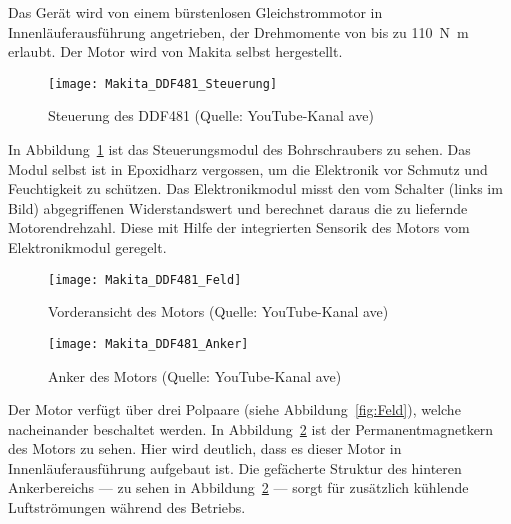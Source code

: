Das Gerät wird von einem bürstenlosen Gleichstrommotor in Innenläuferausführung angetrieben, der Drehmomente von bis zu \SI{110}{\newton\meter} erlaubt. Der Motor wird von Makita selbst hergestellt.

\begin{figure}[h]
  \centering
  \texttt{[image: Makita\_DDF481\_Steuerung]}
  \caption{Steuerung des DDF481 (Quelle: YouTube-Kanal \glqq{}ave\grqq{})}
  \label{fig:Steuerung}
\end{figure}

In Abbildung~\ref{fig:Steuerung} ist das Steuerungsmodul des Bohrschraubers zu sehen. Das Modul selbst ist in Epoxidharz vergossen, um die Elektronik vor Schmutz und Feuchtigkeit zu schützen. Das Elektronikmodul misst den vom Schalter (links im Bild) abgegriffenen Widerstandswert und berechnet daraus die zu liefernde Motorendrehzahl. Diese mit Hilfe der integrierten Sensorik des Motors vom Elektronikmodul geregelt.

\begin{figure}[h]
  \begin{minipage}{.48\textwidth}
    \centering
    \texttt{[image: Makita\_DDF481\_Feld]}
    \caption{Vorderansicht des Motors (Quelle: YouTube-Kanal \glqq{}ave\grqq{})}
    \label{fig:Feld}
  \end{minipage}\hfill%
  \begin{minipage}{.48\textwidth}
    \centering
    \texttt{[image: Makita\_DDF481\_Anker]}
    \caption{Anker des Motors (Quelle: YouTube-Kanal \glqq{}ave\grqq{})}
    \label{fig:Anker}
  \end{minipage}
\end{figure}

Der Motor verfügt über drei Polpaare (siehe Abbildung~\ref{fig:Feld}), welche nacheinander beschaltet werden. In Abbildung~\ref{fig:Anker} ist der Permanentmagnetkern des Motors zu sehen. Hier wird deutlich, dass es dieser Motor in Innenläuferausführung aufgebaut ist. Die gefächerte Struktur des hinteren Ankerbereichs --- zu sehen in Abbildung~\ref{fig:Anker} --- sorgt für zusätzlich kühlende Luftströmungen während des Betriebs.

